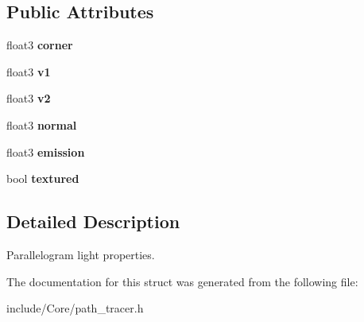 \subsection*{Public Attributes}
\begin{DoxyCompactItemize}
\item 
\hypertarget{struct_parallelogram_light_af3bc36f63daab9cd389969c854efd85f}{float3 {\bfseries corner}}\label{struct_parallelogram_light_af3bc36f63daab9cd389969c854efd85f}

\item 
\hypertarget{struct_parallelogram_light_a0ac3d1102968e6ed8ef485526d695fa4}{float3 {\bfseries v1}}\label{struct_parallelogram_light_a0ac3d1102968e6ed8ef485526d695fa4}

\item 
\hypertarget{struct_parallelogram_light_ab50222b1bd38c096fd0878f58df91222}{float3 {\bfseries v2}}\label{struct_parallelogram_light_ab50222b1bd38c096fd0878f58df91222}

\item 
\hypertarget{struct_parallelogram_light_a2058980a6867965d04e50ef058450c03}{float3 {\bfseries normal}}\label{struct_parallelogram_light_a2058980a6867965d04e50ef058450c03}

\item 
\hypertarget{struct_parallelogram_light_aa480d03790bad09e5bc49947eb45b2dc}{float3 {\bfseries emission}}\label{struct_parallelogram_light_aa480d03790bad09e5bc49947eb45b2dc}

\item 
\hypertarget{struct_parallelogram_light_aed58a5d03c45b7b3b53be4cd597fe16b}{bool {\bfseries textured}}\label{struct_parallelogram_light_aed58a5d03c45b7b3b53be4cd597fe16b}

\end{DoxyCompactItemize}


\subsection{Detailed Description}
Parallelogram light properties. 

The documentation for this struct was generated from the following file\-:\begin{DoxyCompactItemize}
\item 
include/\-Core/path\-\_\-tracer.\-h\end{DoxyCompactItemize}
